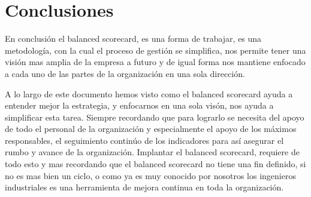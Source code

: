 \section{Conclusiones}

En conclusión el balanced scorecard, es una forma de trabajar, es una metodología, con la cual el proceso de gestión se simplifica, nos permite tener una visión mas amplia de la empresa a futuro y de igual forma nos mantiene enfocado a cada uno de las partes de la organización en una sola dirección.\newline

A lo largo de este documento hemos visto como el balanced scorecard ayuda a entender mejor la estrategia, y enfocarnos en una sola visón, nos ayuda a simplificar esta tarea.
Siempre recordando que para lograrlo se necesita del apoyo de todo el personal de la organización y especialmente el apoyo de los máximos responsables, el seguimiento continúo de los indicadores para así asegurar el rumbo y avance de la organización.
Implantar el balanced scorecard, requiere de todo esto y mas recordando que el balanced scorecard no tiene una fin definido, si no es mas bien un ciclo, o como ya es muy conocido por nosotros los ingenieros industriales es una herramienta de mejora continua en toda la organización.
